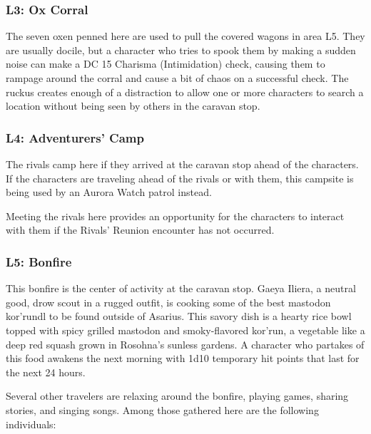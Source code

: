 \documentclass[10pt,a4paper,twoside,bg=print,twocolumn,openany,nodeprecatedcode]{dndbook}
\begin{document}
\subsubsection{L3: Ox Corral}
The seven oxen penned here are used to pull the covered wagons in area L5. They are usually docile, but a character who tries to spook them by making a sudden noise can make a DC 15 Charisma (Intimidation) check, causing them to rampage around the corral and cause a bit of chaos on a successful check. The ruckus creates enough of a distraction to allow one or more characters to search a location without being seen by others in the caravan stop.

\subsubsection{L4: Adventurers' Camp}
The rivals camp here if they arrived at the caravan stop ahead of the characters. If the characters are traveling ahead of the rivals or with them, this campsite is being used by an Aurora Watch patrol instead.

Meeting the rivals here provides an opportunity for the characters to interact with them if the Rivals' Reunion encounter has not occurred.

\subsubsection{L5: Bonfire}
This bonfire is the center of activity at the caravan stop. Gaeya Iliera, a neutral good, drow scout in a rugged outfit, is cooking some of the best mastodon kor'rundl to be found outside of Asarius. This savory dish is a hearty rice bowl topped with spicy grilled mastodon and smoky-flavored kor'run, a vegetable like a deep red squash grown in Rosohna's sunless gardens. A character who partakes of this food awakens the next morning with 1d10 temporary hit points that last for the next 24 hours.

Several other travelers are relaxing around the bonfire, playing games, sharing stories, and singing songs. Among those gathered here are the following individuals:
\end{document}
